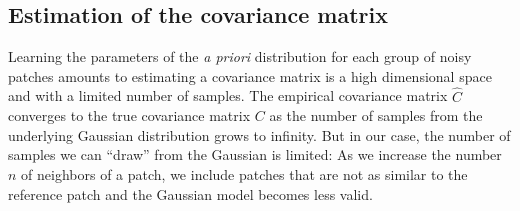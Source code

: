 \documentclass[10pt, journal, twocolumn, final, a4paper]{IEEEtran}
\newcommand{\pa}[1]{\textcolor{cyan}{#1}}
\newcommand{\pcomment}[1]{\textit{\pa{#1}}}
\newcommand{\ma}[1]{\boldsymbol{#1}}
\begin{document}







\subsection{Estimation of the covariance matrix}
\label{sse:covariance-estimation}


Learning the parameters of the \emph{a priori} distribution for each group of
noisy patches amounts to estimating a covariance matrix is a high dimensional space 
and with a limited number of samples. 
%
The empirical covariance matrix $\widehat C$ converges to the true covariance matrix
$C$ as the number of samples from the underlying Gaussian distribution grows to infinity.
But in our case, the number of samples we can ``draw'' from the Gaussian is limited:
As we increase the number $n$ of neighbors of a patch, we include patches
that are not as similar to the reference patch and the Gaussian model becomes less valid. 
\end{document}
